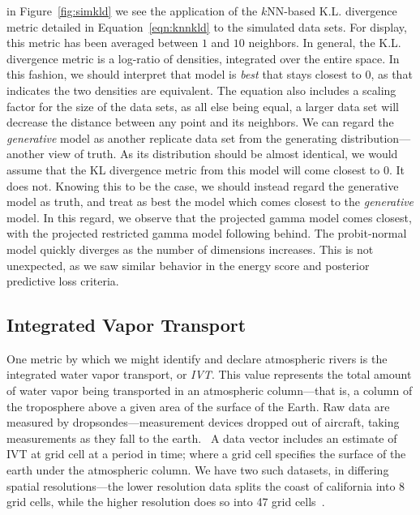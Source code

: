 in Figure~\ref{fig:simkld} we see the application of the $k$NN-based K.L. divergence metric detailed
  in Equation~\ref{eqn:knnkld} to the simulated data sets.  For display, this metric has been averaged
  between $1$ and $10$ neighbors.  In general, the K.L. divergence metric is a log-ratio
  of densities, integrated over the entire space.  In this fashion, we should interpret that model
  is \emph{best} that stays closest to 0, as that indicates the two densities are equivalent.  The
  equation also includes a scaling factor for the size of the data sets, as all else being equal, a
  larger data set will decrease the distance between any point and its neighbors.  We can regard the
  \emph{generative} model as another replicate data set from the generating distribution---another
  view of truth.  As its distribution should be almost identical, we would assume that the KL divergence
  metric from this model will come closest to 0.  It does not.  Knowing this to be the case, we should
  instead regard the generative model as truth, and treat as best the model which comes closest to the
  \emph{generative} model.  In this regard, we observe that the projected gamma model comes closest,
  with the projected restricted gamma model following behind.  The probit-normal model quickly diverges
  as the number of dimensions increases.  This is not unexpected, as we saw similar behavior in the
  energy score and posterior predictive loss criteria.

\subsection{Integrated Vapor Transport\label{subsec:ivt}}
One metric by which we might identify and declare atmospheric rivers is the integrated water vapor
  transport, or \emph{IVT}.  This value represents the total amount of water
  vapor being transported in an atmospheric column---that is, a column of the troposphere above a given
  area of the surface of the Earth. Raw data are measured by dropsondes---measurement devices dropped
  out of aircraft, taking measurements as they fall to the earth.~\citep{ralph2017}  A data vector
  includes an estimate of IVT at grid cell at a period in time; where a grid cell specifies the surface
  of the earth under the atmospheric column.  We have two such datasets, in differing spatial
  resolutions---the lower resolution data splits the coast of california into 8 grid cells, while the
  higher resolution does so into 47 grid cells~\citep{guan2015}.

